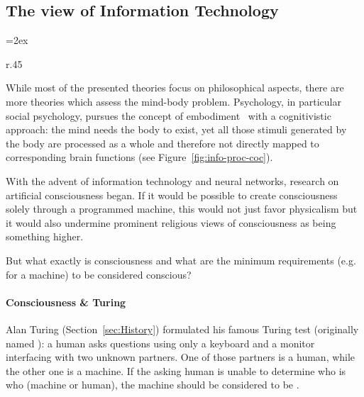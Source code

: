 

\subsection{The view of Information Technology}

{\columnsep=2ex\begin{wrapfigure}[11]{r}{.45\linewidth}
\vspace*{-.9\baselineskip}
\caption{Cognitivistic information processing.}
\label{fig:info-proc-coc}
\end{wrapfigure}
While most of the presented theories focus on philosophical aspects, there are more theories which assess the \mbox{mind-body} problem.
Psychology, in particular social psychology, pursues the concept of embodiment~\cite{meier2012embodiment} with a cognitivistic approach:
the mind needs the body to exist, yet all those stimuli generated by the body are processed as a whole and therefore not directly mapped to corresponding brain functions (see Figure~\ref{fig:info-proc-coc}).\par}

With the advent of information technology and neural networks, research on artificial consciousness began. If it would be possible to create consciousness solely through a programmed machine, this would not just favor physicalism but it would also undermine prominent religious views of consciousness as being something higher.

But what exactly is consciousness and what are the minimum requirements (e.g. for a machine) to be considered conscious?

\paragraph{Consciousness \& Turing} Alan Turing (Section~\ref{sec:History}) formulated his famous Turing test (originally named ): a human asks questions using only a
keyboard and a monitor interfacing with two unknown partners. One of those partners is a human, while the other one is a machine. If the asking human is unable to determine who is who (machine or human), the machine should be considered to be .

